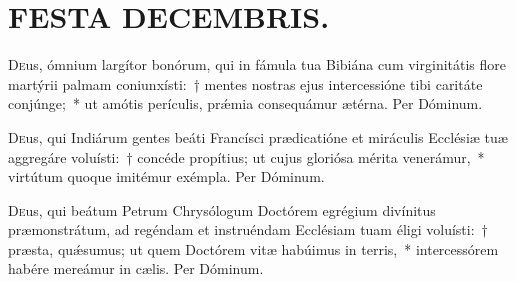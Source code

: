 \documentclass[vesperale_romanum.tex]{subfiles}
\begin{document}
\myrule

\newpage
\thispagestyle{empty}
\section[Festa Decembris.]{FESTA DECEMBRIS.}


\semiduplex

\oratio

\lettrine{D}{e}us, ó\-mnium largítor bonórum, qui in fámula tua Bibiána cum virginitátis flore martýrii palmam coniunxísti:~† mentes nostras ejus intercessióne tibi caritáte conjúnge;~* ut amótis perículis, prǽmia consequámur ætérna.
Per Dóminum.



\myrule



\duplexmajus

\oratio

\lettrine{D}{e}us, qui Indiárum gentes beáti Francísci prædicatióne et miráculis Ecclésiæ tuæ aggregáre voluísti:~† concéde propítius; ut cujus gloriósa mérita venerámur,~* virtútum quoque imitémur exémpla. Per Dóminum.



\myrule


\duplexmtv


\oratio

\lettrine{D}{e}us, qui beátum Petrum Chrysólogum Do\-ctórem egrégium divínitus præmonstrátum, ad regéndam et instruéndam Ecclésiam tuam éligi voluísti:~† præsta, quǽsumus; ut quem Do\-ctórem vitæ habúimus in terris,~* intercessórem habére mereámur in cælis. Per Dóminum.
\end{document}
